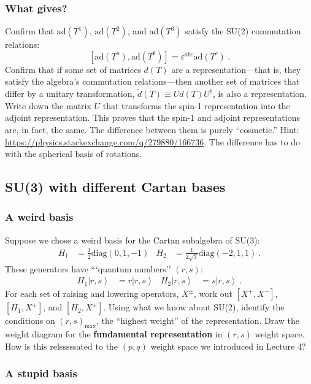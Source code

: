 \documentclass[12pt]{article}
\numberwithin{equation}{subsection}    %
\renewcommand{\tilde}{\widetilde}   %
\newcommand{\ket}[1]{\left|#1\right\rangle}    %
\begin{document}
\subsubsection{What gives?}

Confirm that $\text{ad}(T^1)$, $\text{ad}(T^2)$, and $\text{ad}(T^3)$ satisfy the SU(2) commutation relations: $$[\text{ad}(T^a), \text{ad}(T^b)] = \varepsilon^{abc}\text{ad}(T^c) \ .$$
Confirm that if some set of matrices $d(T)$ are a representation---that is, they satisfy the algebra's commutation relations---then another set of matrices that differ by a unitary transformation, $\tilde d(T) \equiv U d(T) U^\dag$, is also a representation. Write down the matrix $U$ that transforms the spin-1 representation into the adjoint representation. This proves that the spin-1 and adjoint representations are, in fact, the same. The difference between them is purely ``cosmetic.'' Hint: \url{https://physics.stackexchange.com/q/279880/166736}. The difference has to do with the spherical basis of rotations.

\subsection{SU(3) with different Cartan bases}

\subsubsection{A weird basis}

Suppose we chose a weird basis for the Cartan subalgebra of SU(3):
\begin{align}
  H_1 &= \frac{1}{2}\text{diag}(0, 1, -1)
  &
  H_2 &= \frac{1}{2\sqrt{3}}\text{diag}(-2, 1, 1) \ .
\end{align}
These generators have ```quantum numbers'' $(r,s)$:
\begin{align}
  H_1 \ket{r,s} &= r \ket{r,s} &
  H_2 \ket{r,s} &= s \ket{r,s}  \ .
\end{align}
For each set of raising and lowering operators, $X^\pm$, work out $[X^+, X^-]$, $[H_1,X^\pm]$, and $[H_2,X^\pm]$. Using what we know about SU(2), identify the conditions on $(r,s)_\text{max}$, the ``highest weight'' of the representation. Draw the weight diagram for the \textbf{fundamental representation} in $(r,s)$ weight space. How is this relsssssated to the $(p,q)$ weight space we introduced in Lecture 4?

\subsubsection{A stupid basis}
\end{document}
